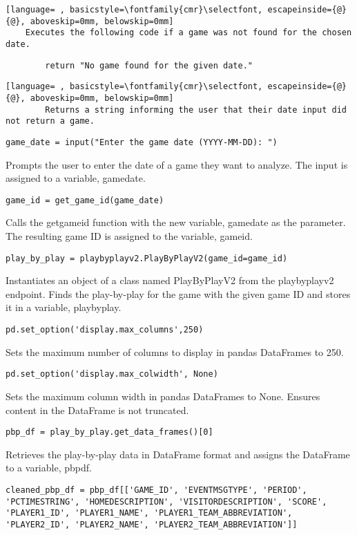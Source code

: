 \documentclass{article}
\begin{document}
\begin{lstlisting}[language= , basicstyle=\fontfamily{cmr}\selectfont, escapeinside={@}{@}, aboveskip=0mm, belowskip=0mm]
    Executes the following code if a game was not found for the chosen date.
\end{lstlisting}
\begin{lstlisting}
        return "No game found for the given date."
\end{lstlisting}
\begin{lstlisting}[language= , basicstyle=\fontfamily{cmr}\selectfont, escapeinside={@}{@}, aboveskip=0mm, belowskip=0mm]
        Returns a string informing the user that their date input did not return a game.
\end{lstlisting}
\begin{lstlisting}
game_date = input("Enter the game date (YYYY-MM-DD): ")
\end{lstlisting}
Prompts the user to enter the date of a game they want to analyze. The input is assigned to a variable, game\textunderscore date.
\begin{lstlisting}
game_id = get_game_id(game_date)
\end{lstlisting}
Calls the get\textunderscore game\textunderscore id function with the new variable, game\textunderscore date as the parameter. The resulting game ID is assigned to the variable, game\textunderscore id.
\begin{lstlisting}
play_by_play = playbyplayv2.PlayByPlayV2(game_id=game_id)
\end{lstlisting}
Instantiates an object of a class named PlayByPlayV2 from the playbyplayv2 endpoint. Finds the play-by-play for the game with the given game ID and stores it in a variable, play\textunderscore by\textunderscore play.
\begin{lstlisting}
pd.set_option('display.max_columns',250)
\end{lstlisting}
Sets the maximum number of columns to display in pandas DataFrames to 250.
\begin{lstlisting}
pd.set_option('display.max_colwidth', None)
\end{lstlisting}
Sets the maximum column width in pandas DataFrames to None. Ensures content in the DataFrame is not truncated.
\begin{lstlisting}
pbp_df = play_by_play.get_data_frames()[0]
\end{lstlisting}
Retrieves the play-by-play data in DataFrame format and assigns the DataFrame to a variable, pbp\textunderscore df.
\begin{lstlisting}
cleaned_pbp_df = pbp_df[['GAME_ID', 'EVENTMSGTYPE', 'PERIOD', 'PCTIMESTRING', 'HOMEDESCRIPTION', 'VISITORDESCRIPTION', 'SCORE', 'PLAYER1_ID', 'PLAYER1_NAME', 'PLAYER1_TEAM_ABBREVIATION', 'PLAYER2_ID', 'PLAYER2_NAME', 'PLAYER2_TEAM_ABBREVIATION']]
\end{lstlisting}
\end{document}
